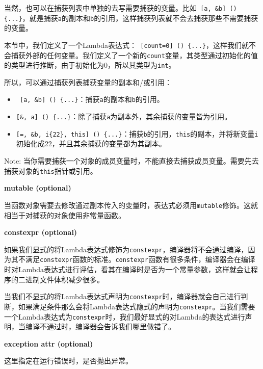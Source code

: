 当然，也可以在捕获列表中单独的去写需要捕获的变量。比如\texttt{ [a, \&b] () \{...\}}，就是捕获\texttt{a}的副本和\texttt{b}的引用，这样捕获列表就不会去捕获那些不需要捕获的变量。

本节中，我们定义了一个Lambda表达式：\texttt{ [count=0] () \{...\}}，这样我们就不会捕获外部的任何变量。我们定义了一个新的\texttt{count}变量，其类型通过初始化的值的类型进行推断，由于初始化为0，所以其类型为\texttt{int}。

所以，可以通过捕获列表捕获变量的副本和/或引用：

\begin{itemize}
\item \texttt{ [a, \&b] () \{...\}}：捕获\texttt{a}的副本和\texttt{b}的引用。

\item \texttt{[\&, a] () \{...\}}：除了捕获\texttt{a}为副本外，其余捕获的变量皆为引用。

\item \texttt{[=, \&b, i\{22\}, this] () \{...\}}：捕获\texttt{b}的引用，\texttt{this}的副本，并将新变量\texttt{i}初始化成22，并且其余捕获的变量都为其副本。

\end{itemize}

\begin{myInfoBox}
Note: 当你需要捕获一个对象的成员变量时，不能直接去捕获成员变量。需要先去捕获对象的\texttt{this}指针或引用。
\end{myInfoBox}

\textbf{mutable (optional)}

当函数对象需要去修改通过副本传入的变量时，表达式必须用\texttt{mutable}修饰。这就相当于对捕获的对象使用非常量函数。

\textbf{constexpr (optional)}

如果我们显式的将Lambda表达式修饰为\texttt{constexpr}，编译器将不会通过编译，因为其不满足\texttt{constexpr}函数的标准。\texttt{constexpr}函数有很多条件，编译器会在编译时对Lambda表达式进行评估，看其在编译时是否为一个常量参数，这样就会让程序的二进制文件体积减少很多。

当我们不显式的将Lambda表达式声明为\texttt{constexpr}时，编译器就会自己进行判断，如果满足条件那么会将Lambda表达式隐式的声明为\texttt{constexpr}。当我们需要一个Lambda表达式为\texttt{constexpr}时，我们最好显式的对Lambda的表达式进行声明，当编译不通过时，编译器会告诉我们哪里做错了。

\textbf{exception attr (optional)}

这里指定在运行错误时，是否抛出异常。

